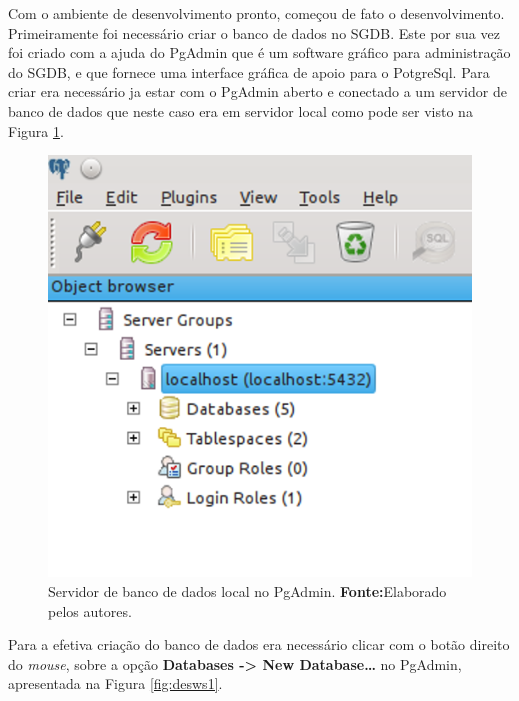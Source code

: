 
	
	\par Com o ambiente de desenvolvimento pronto, começou de fato o
desenvolvimento. Primeiramente foi necessário criar o banco de dados no SGDB.
Este por sua vez foi criado com a ajuda do PgAdmin que é um software gráfico
para administração do SGDB, e que fornece uma interface gráfica de apoio para o
PotgreSql. Para criar era necessário ja estar com o PgAdmin aberto e conectado
a um servidor de banco de dados que neste caso era em servidor local como pode
ser visto na Figura \ref{fig:desws}.

	\begin{figure}[h!]
		\centerline{\includegraphics[scale=1]{./imagens/2_q_metodologico/4_procedimentos_resultados/43_webservice/432_desenvolvimento/desws.png}}
		\caption[Servidor de banco de dados local no PgAdmin]{Servidor de banco de
		dados local no PgAdmin.
			\textbf{Fonte:}Elaborado pelos autores.}
		\label{fig:desws}
	\end{figure}
	
	\par Para a efetiva criação do banco de dados era necessário clicar com o
botão direito do \textit{mouse}, sobre a opção \textbf{Databases -> New
Database\ldots} no PgAdmin, apresentada na Figura \ref{fig:desws1}.


